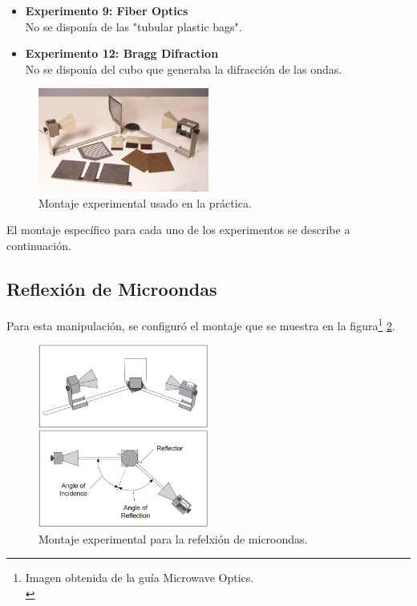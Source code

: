 \documentclass[prb,aps,twocolumn,preprintnumbers,amsmath,amssymb]{revtex4}
\begin{document}
\begin{itemize}
	\item \textbf{Experimento 9: Fiber Optics} \\No se disponía de las "tubular plastic bags".
	
	\item \textbf{Experimento 12: Bragg Difraction} \\ No se disponía del cubo que generaba la difracción de las ondas.
\end{itemize}

\begin{figure}[h!]
	\centering
	\includegraphics[width=0.5\textwidth]{montaje}
	\caption{ Montaje experimental usado en la práctica.}
	\label{fig: montaje}
\end{figure}

El montaje específico para cada uno de los experimentos se describe a continuación.

\subsection{Reflexión de Microondas}
Para esta manipulación, se configuró el montaje que se muestra en la figura\footnote{Imagen obtenida de la guía Microwave Optics.\\} \ref{fig:reflexion}.\\

\begin{figure}[h!]
\centering
\includegraphics[width=0.5\textwidth]{reflection}
\caption{Montaje experimental para la refelxión de microondas.}
\label{fig:reflexion}
\end{figure}
\end{document}
